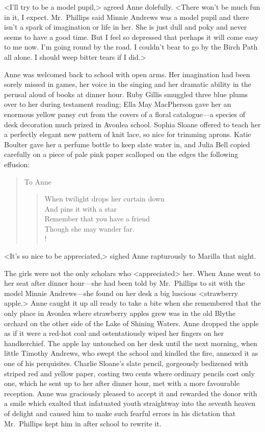 <I'll try to be a model pupil,> agreed Anne dolefully. <There won't be much fun in it, I expect. Mr.~Phillips said Minnie Andrews was a model pupil and there isn't a spark of imagination or life in her. She is just dull and poky and never seems to have a good time. But I feel so depressed that perhaps it will come easy to me now. I'm going round by the road. I couldn't bear to go by the Birch Path all alone. I should weep bitter tears if I did.>

Anne was welcomed back to school with open arms. Her imagination had been sorely missed in games, her voice in the singing and her dramatic ability in the perusal aloud of books at dinner hour. Ruby Gillis smuggled three blue plums over to her during testament reading; Ella May MacPherson gave her an enormous yellow pansy cut from the covers of a floral catalogue—a species of desk decoration much prized in Avonlea school. Sophia Sloane offered to teach her a perfectly elegant new pattern of knit lace, so nice for trimming aprons. Katie Boulter gave her a perfume bottle to keep slate water in, and Julia Bell copied carefully on a piece of pale pink paper scalloped on the edges the following effusion:

\begin{quote}
\noindent To Anne

\begin{verse}
	\begin{altverse}
When twilight drops her curtain down\\
And pins it with a star\\
Remember that you have a friend\\
Though she may wander far.\\!
\end{altverse}
\end{verse}
\end{quote}

<It's so nice to be appreciated,> sighed Anne rapturously to Marilla that night.

The girls were not the only scholars who <appreciated> her. When Anne went to her seat after dinner hour—she had been told by Mr.~Phillips to sit with the model Minnie Andrews—she found on her desk a big luscious <strawberry apple.> Anne caught it up all ready to take a bite when she remembered that the only place in Avonlea where strawberry apples grew was in the old Blythe orchard on the other side of the Lake of Shining Waters. Anne dropped the apple as if it were a red-hot coal and ostentatiously wiped her fingers on her handkerchief. The apple lay untouched on her desk until the next morning, when little Timothy Andrews, who swept the school and kindled the fire, annexed it as one of his perquisites. Charlie Sloane's slate pencil, gorgeously bedizened with striped red and yellow paper, costing two cents where ordinary pencils cost only one, which he sent up to her after dinner hour, met with a more favourable reception. Anne was graciously pleased to accept it and rewarded the donor with a smile which exalted that infatuated youth straightway into the seventh heaven of delight and caused him to make such fearful errors in his dictation that Mr.~Phillips kept him in after school to rewrite it.

